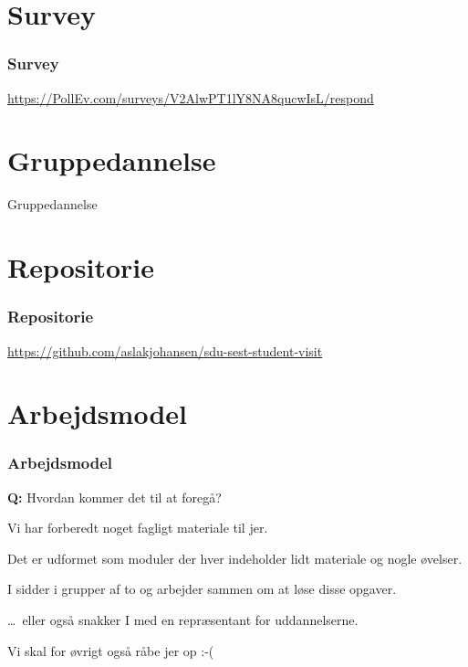 \section{Survey}
\begin{frame}
    \frametitle{Survey}
    \begin{center}
    
      \vspace{4mm}
      \url{https://PollEv.com/surveys/V2AlwPT1lY8NA8qucwIsL/respond}
    \end{center}
\end{frame}

\section{Gruppedannelse}
\begin{frame}
  \vspace{32mm}
  \begin{center}
    \Huge{Gruppedannelse}
  \end{center}
\end{frame}

\section{Repositorie}
\begin{frame}
    \frametitle{Repositorie}
    \begin{center}
      \url{https://github.com/aslakjohansen/sdu-sest-student-visit}
    \end{center}
\end{frame}

\section{Arbejdsmodel}
\begin{frame}
  \frametitle{Arbejdsmodel}
  \vspace{3mm}
  \textbf{Q:} Hvordan kommer det til at foregå?
  
  \pause
  \vspace{5mm}
  Vi har forberedt noget fagligt materiale til jer.
  
  \vspace{5mm}
  Det er udformet som moduler der hver indeholder lidt materiale og nogle øvelser.
  
  \vspace{5mm}
  I sidder i grupper af to og arbejder sammen om at løse disse opgaver.
  
  \pause
  \vspace{5mm}
  \ldots\ eller også snakker I med en repræsentant for uddannelserne.
  
  \pause
  \vspace{5mm}
  Vi skal for øvrigt også råbe jer op :-(
\end{frame}

